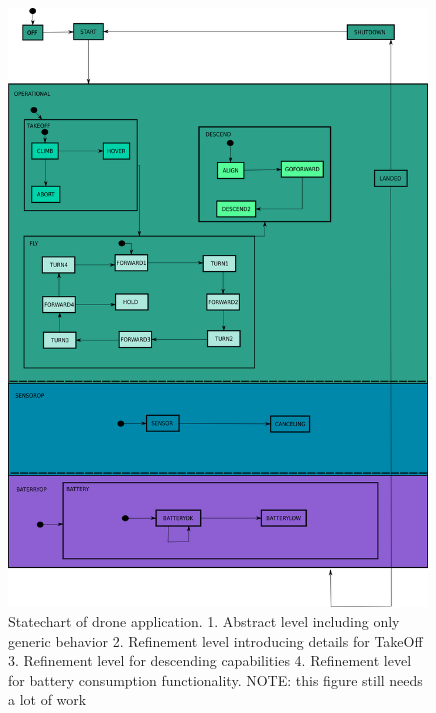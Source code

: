 \begin{figure}[!h]
	\vspace{-.4cm}
	\centering
	\includegraphics[width=0.99\textwidth]{figures/drone.png}
	\caption{Statechart of drone application. 1. Abstract level including only generic behavior 
	2. Refinement level introducing details for TakeOff 3. Refinement level for descending capabilities 
	4. Refinement level for battery consumption functionality. NOTE: this figure still needs a lot of work}
	\label{fig:drone1}
	\label{fig:drone2}
	\label{fig:drone3}
	\vspace{-.4cm}
\end{figure} 
